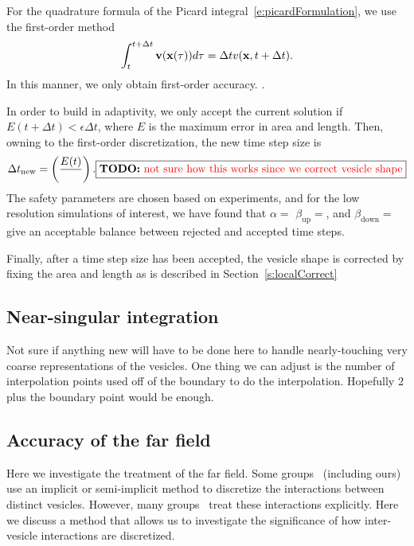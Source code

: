 For the quadrature formula of the Picard
integral~\eqref{e:picardFormulation}, we use the first-order method
\begin{align*}
  \int_{t}^{t+\Delta t} {\mathbf{v}}({\mathbf{x}}(\tau))d\tau = \Delta t v({\mathbf{x}},t+\Delta t).
\end{align*}
In this manner, we only obtain first-order accuracy. .

In order to build in adaptivity, we only accept the current solution if
$E(t+\Delta t) < \epsilon \Delta t$, where $E$ is the maximum error in area
and length.  Then, owning to the first-order discretization, the new
time step size is
\begin{align*}
  \Delta t_{\mathrm{new}} = \left(\frac{E(t) }{}  \right).
  \fbox{{\bf TODO:} \color{red} not sure how this works since we correct vesicle shape}
\end{align*}
The safety parameters are chosen based on experiments, and for the low
resolution simulations of interest, we have found that $\alpha=$
$\beta_{\mathrm{up}}=$, and $\beta_{\mathrm{down}}=$ give an acceptable
balance between rejected and accepted time steps.

Finally, after a time step size has been accepted, the vesicle shape is
corrected by fixing the area and length as is described in
Section~\ref{s:localCorrect}


\subsection{Near-singular integration}
Not sure if anything new will have to be done here to handle
nearly-touching very coarse representations of the vesicles.
One thing we can adjust is the number of interpolation points used off
of the boundary to do the interpolation.  Hopefully 2 plus the boundary
point would be enough.


\subsection{Accuracy of the far field}
Here we investigate the treatment of the far field.  Some
groups~\cite{} (including ours) use an implicit or semi-implicit method
to discretize the interactions between distinct vesicles.  However,
many groups~\cite{} treat these interactions explicitly.  Here we
discuss a method that allows us to investigate the significance of how
inter-vesicle interactions are discretized.

